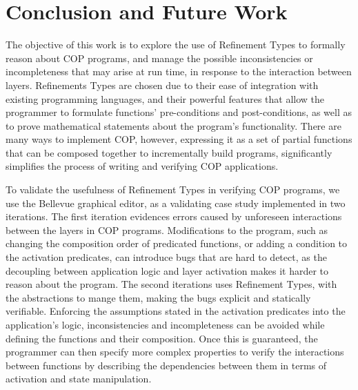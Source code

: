 
\section{Conclusion and Future Work}
\label{sec:conclusion}

The objective of this work is to explore the use of Refinement Types to formally reason about \ac{COP} 
programs, and manage the possible inconsistencies or incompleteness that may arise at run time, in 
response to the interaction between layers. Refinements Types are chosen due to their ease of 
integration with existing programming languages, and their powerful features that allow the programmer 
to formulate functions' pre-conditions and post-conditions, as well as to prove mathematical statements 
about the program's functionality. There are many ways to implement \ac{COP}, however, expressing it 
as a set of partial functions that can be composed together to incrementally build programs, significantly 
simplifies the process of writing and verifying \ac{COP} applications.

To validate the usefulness of Refinement Types in verifying \ac{COP} programs, we use the Bellevue 
graphical editor, as a validating case study implemented in two iterations. The first iteration evidences 
errors caused by unforeseen interactions between the layers in \ac{COP} programs. Modifications to the 
program, such as changing the composition order of predicated functions, or adding a condition to the 
activation predicates, can introduce bugs that are hard to detect, as the decoupling between application 
logic and layer activation makes it harder to reason about the program. The second iterations uses
Refinement Types, with the abstractions to mange them, making the bugs explicit and statically 
verifiable. Enforcing the assumptions stated in the activation predicates into the application's logic, 
inconsistencies and incompleteness can be avoided while defining the functions and their composition. 
Once this is guaranteed, the programmer can then specify more complex properties to verify the 
interactions between functions by describing the dependencies between them in terms of activation and 
state manipulation.

